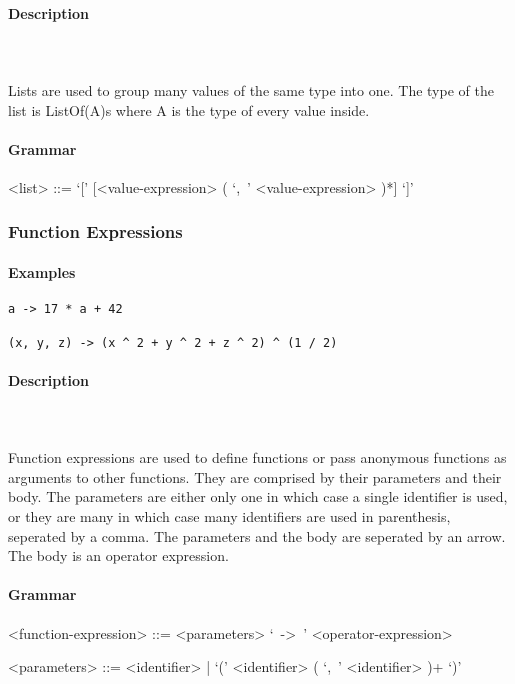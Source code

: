 \documentclass{article}
\def\pend{\mbox{} \\\\}
\begin{document}
\paragraph{Description}\pend
Lists are used to group many values of the same type into one. 
The type of the list is ListOf(A)s where A is the type of every value inside.

\paragraph{Grammar}
\begin{grammar}
<list> ::= `[' [<value-expression> ( `,\ ' <value-expression> )*] `]'
\end{grammar}

\subsubsection{Function Expressions}

\paragraph{Examples}

\begin{verbatim}
a -> 17 * a + 42

(x, y, z) -> (x ^ 2 + y ^ 2 + z ^ 2) ^ (1 / 2)
\end{verbatim}

\paragraph{Description}\pend
Function expressions are used to define functions or pass anonymous functions as 
arguments to other functions. They are comprised by their parameters and their 
body. The parameters are either only one in which case a single identifier is used, 
or they are many in which case many identifiers are used in parenthesis, seperated 
by a comma. The parameters and the body are seperated by an arrow.
The body is an operator expression.

\paragraph{Grammar}
\begin{grammar}
<function-expression> ::= <parameters> `\ ->\ ' <operator-expression>

<parameters> ::= <identifier> | `(' <identifier> ( `,\ ' <identifier> )+ `)'
\end{grammar}
\end{document}
